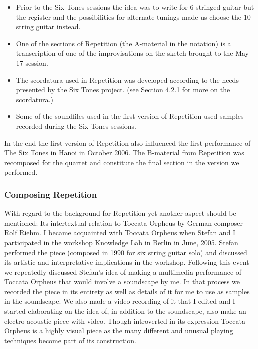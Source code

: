 \begin{itemize}
\item Prior to the Six Tones sessions the idea was to write for
  6-stringed guitar but the register and the possibilities for
  alternate tunings made us choose the 10-string guitar instead.
\item One of the sections of Repetition (the A-material in the
  notation) is a transcription of one of the improvisations on the
  sketch brought to the May 17 session.
\item The scordatura used in Repetition was developed according to the
  needs presented by the Six Tones project. (see Section 4.2.1 for
  more on the scordatura.)
\item Some of the soundfiles used in the first version of Repetition
  used samples recorded during the Six Tones sessions.
\end{itemize}

In the end the first version of Repetition also influenced the first
performance of The Six Tones in Hanoi in October 2006. The B-material
from Repetition was recomposed for the quartet and constitute the
final section in the version we performed.

\subsubsection{Composing Repetition }
\label{sec:comp-repet-}

With regard to the background for Repetition yet another aspect should
be mentioned: Its intertextual relation to Toccata Orpheus by German
composer Rolf Riehm. I became acquainted with Toccata Orpheus when
Stefan and I participated in the workshop Knowledge Lab in Berlin in
June, 2005. Stefan performed the piece (composed in 1990 for six
string guitar solo) and discussed its artistic and interpretative
implications in the workshop. Following this event we repeatedly
discussed Stefan's idea of making a multimedia performance of Toccata
Orpheus that would involve a soundscape by me. In that process we
recorded the piece in its entirety as well as details of it for me to
use as samples in the soundscape. We also made a video recording of it
that I edited and I started elaborating on the idea of, in addition to
the soundscape, also make an electro acoustic piece with video. Though
introverted in its expression Toccata Orpheus is a highly visual piece
as the many different and unusual playing techniques become part of
its construction.

